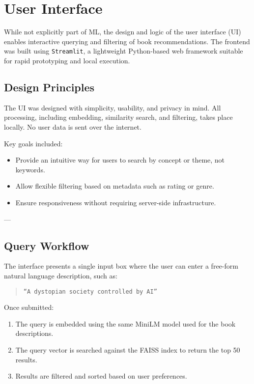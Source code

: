 \chapter{User Interface}
\label{chapter:interface}

While not explicitly part of ML, the design and logic of the user interface (UI) enables interactive querying and filtering of book recommendations.
The frontend was built using \texttt{Streamlit}, a lightweight Python-based web framework suitable for rapid prototyping and local execution.

\section{Design Principles}
\label{sec:ui-design}

The UI was designed with simplicity, usability, and privacy in mind. All processing, including embedding, similarity search, and filtering, takes place locally. No user data is sent over the internet.

Key goals included:

\begin{itemize}
    \item Provide an intuitive way for users to search by concept or theme, not keywords.
    \item Allow flexible filtering based on metadata such as rating or genre.
    \item Ensure responsiveness without requiring server-side infrastructure.
\end{itemize}

---

\section{Query Workflow}
\label{sec:ui-query-workflow}

The interface presents a single input box where the user can enter a free-form natural language description, such as:

\begin{quote}
    \texttt{“A dystopian society controlled by AI”}
\end{quote}

Once submitted:

\begin{enumerate}
    \item The query is embedded using the same MiniLM model used for the book descriptions.
    \item The query vector is searched against the FAISS index to return the top 50 results.
    \item Results are filtered and sorted based on user preferences.
\end{enumerate}

